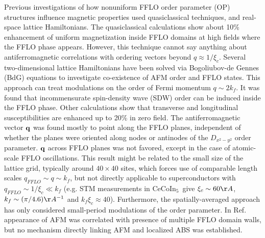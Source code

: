 \documentclass[prb,aps,showpacs,amsmath,twocolumn,10pt]{revtex4-1}
\newcommand{\cecoin}{CeCoIn$_5$}
\begin{document}
Previous investigations of how nonuniform FFLO order parameter (OP) 
structures influence magnetic properties used quasiclassical techniques,
and real-space lattice Hamiltonians. 
The quasiclassical calculations\cite{Burkhardt1994,Vorontsov:2006fc} 
show about 10\% enhancement of uniform 
magnetization inside FFLO domains at high fields where the FFLO phase appears. 
However, this technique cannot say anything about antiferromagnetic correlations 
with ordering vectors beyond $q \approx 1/\xi_c$. 
Several two-dimensional lattice Hamiltonians have been solved via Bogoliubov-de Gennes (BdG) equations 
to investigate co-existence of AFM order and FFLO states.\cite{Yanase2009, Yanase2009abs, Marcin2009, Yanase2011} 
This approach can treat modulations on the order of Fermi momentum $q \sim 2k_f$. 
It was found that incommensurate spin-density wave (SDW) order
can be induced inside the FFLO phase.\cite{Yanase2009,Yanase2009abs} 
Other calculations show that transverse and longitudinal susceptibilities are enhanced up to 20\% in zero
field.\cite{Marcin2009}
The antiferromagnetic vector ${\bf q}$ was found mostly to point along the FFLO
planes,\cite{Yanase2009,Yanase2009abs} 
independent of whether the planes were oriented along nodes or
antinodes of the $D_{x^2-y^2}$ order parameter. 
${\bf q}$ across FFLO planes was not favored, except in the case of
atomic-scale {FFLO} oscillations.\cite{Marcin2009,Yanase2011}
This result might be related to the small size of the lattice grid, typically around $40\times40$ sites, 
which forces use of comparable length scales $q_{FFLO} \sim q \sim k_f$, 
but not directly applicable to superconductors with $ q_{FFLO} \sim 1/\xi_c \ll k_f$ 
(e.g. STM measurements\cite{Zhou:2013dq,Allan2013_stm115} in \cecoin\ give 
$\xi_c \sim 60 \AA$, $k_f \sim (\pi/4.6) \AA^{-1}$ and $k_f \xi_c \approx 40$).
Furthermore, 
the spatially-averaged approach\cite{Marcin2009} has only considered
small-period modulations of the order parameter. 
In Ref.~ 
appearance of AFM was correlated with presence of multiple FFLO domain walls,
but no mechanism directly linking AFM and localized ABS was established. 
\end{document}

